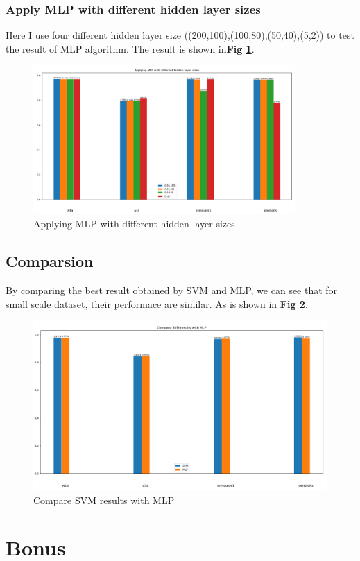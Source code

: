 \documentclass{article}
\theoremstyle{definition}
\numberwithin{equation}{section}
\numberwithin{figure}{section}
\begin{document}
\subsubsection{Apply MLP with different hidden layer sizes}
Here I use four different hidden layer size ((200,100),(100,80),(50,40),(5,2)) to test the result of MLP algorithm. The result is shown in\textbf{Fig \ref{hidden}}.
\begin{figure}[htbp]
  	\centering
  	\includegraphics[width=10cm]{fig/hidden.png}
  \caption{Applying MLP with different hidden layer sizes}
  \label{hidden}
  \end{figure}

\subsection{Comparsion}
By comparing the best result obtained by SVM and MLP, we can see that for small scale dataset, their performace are similar. As is shown in \textbf{Fig \ref{compare}}.
\begin{figure}[htbp]
    	\centering
    	\includegraphics[width=12cm]{fig/compare.png}
    \caption{Compare SVM results with MLP}
    \label{compare}
    \end{figure}
\section{Bonus}
\end{document}
